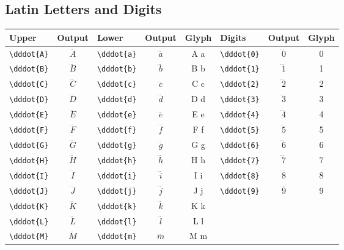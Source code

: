 \documentclass[12pt,a4paper]{article}
\begin{document}
\subsection*{Latin Letters and Digits}
\begin{longtable}{|l|c|l|c|c|l|c|c|}
\hline
\textbf{Upper}   & \textbf{Output} & \textbf{Lower}   & \textbf{Output} & \textbf{Glyph} & \textbf{Digits}  & \textbf{Output} & \textbf{Glyph} \\
\hline
\verb|\dddot{A}| & $\dddot{A}$     & \verb|\dddot{a}| & $\dddot{a}$     & A⃛ a⃛            & \verb|\dddot{0}| & $\dddot{0}$     & 0⃛ \\
\verb|\dddot{B}| & $\dddot{B}$     & \verb|\dddot{b}| & $\dddot{b}$     & B⃛ b⃛            & \verb|\dddot{1}| & $\dddot{1}$     & 1⃛ \\
\verb|\dddot{C}| & $\dddot{C}$     & \verb|\dddot{c}| & $\dddot{c}$     & C⃛ c⃛            & \verb|\dddot{2}| & $\dddot{2}$     & 2⃛ \\
\verb|\dddot{D}| & $\dddot{D}$     & \verb|\dddot{d}| & $\dddot{d}$     & D⃛ d⃛            & \verb|\dddot{3}| & $\dddot{3}$     & 3⃛ \\
\verb|\dddot{E}| & $\dddot{E}$     & \verb|\dddot{e}| & $\dddot{e}$     & E⃛ e⃛            & \verb|\dddot{4}| & $\dddot{4}$     & 4⃛ \\
\verb|\dddot{F}| & $\dddot{F}$     & \verb|\dddot{f}| & $\dddot{f}$     & F⃛ f⃛            & \verb|\dddot{5}| & $\dddot{5}$     & 5⃛ \\
\verb|\dddot{G}| & $\dddot{G}$     & \verb|\dddot{g}| & $\dddot{g}$     & G⃛ g⃛            & \verb|\dddot{6}| & $\dddot{6}$     & 6⃛ \\
\verb|\dddot{H}| & $\dddot{H}$     & \verb|\dddot{h}| & $\dddot{h}$     & H⃛ h⃛            & \verb|\dddot{7}| & $\dddot{7}$     & 7⃛ \\
\verb|\dddot{I}| & $\dddot{I}$     & \verb|\dddot{i}| & $\dddot{i}$     & I⃛ i⃛            & \verb|\dddot{8}| & $\dddot{8}$     & 8⃛ \\
\verb|\dddot{J}| & $\dddot{J}$     & \verb|\dddot{j}| & $\dddot{j}$     & J⃛ j⃛            & \verb|\dddot{9}| & $\dddot{9}$     & 9⃛ \\
\verb|\dddot{K}| & $\dddot{K}$     & \verb|\dddot{k}| & $\dddot{k}$     & K⃛ k⃛            &                  &                 & \\
\verb|\dddot{L}| & $\dddot{L}$     & \verb|\dddot{l}| & $\dddot{l}$     & L⃛ l⃛            &                  &                 & \\
\verb|\dddot{M}| & $\dddot{M}$     & \verb|\dddot{m}| & $\dddot{m}$     & M⃛ m⃛            &                  &                 & \\

\end{longtable}
\end{document}
